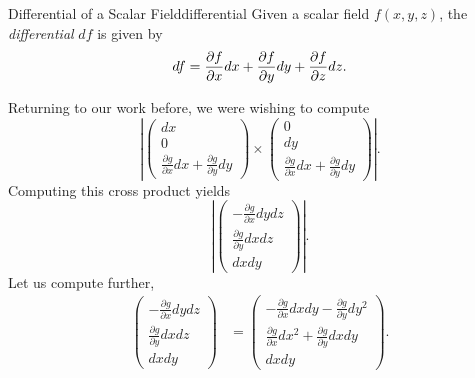                                       \begin{df}{Differential of a Scalar Field}{differential}
                                      	Given a scalar field $f(x,y,z)$, the \emph{differential} $df$ is given by
                                      	\[
                                      	df = \frac{\partial f}{\partial x}dx + \frac{\partial f}{\partial y} dy + \frac{\partial f}{\partial z} dz.
                                      	\]
                                      \end{df}
                                      
                                     Returning to our work before, we were wishing to compute
                                     \[
                                     \left| \begin{pmatrix} dx \\ 0 \\  \frac{\partial g}{\partial x}dx + \frac{\partial g}{\partial y}dy \end{pmatrix} \times \begin{pmatrix} 0 \\ dy \\  \frac{\partial g}{\partial x}dx + \frac{\partial g}{\partial y}dy \end{pmatrix}\right|.
                                     \]
                                     Computing this cross product yields
                                     \[
                                     \left| \begin{pmatrix} -\frac{\partial g}{\partial x} dydz \\ \frac{\partial g}{\partial y}dxdz \\ dxdy \end{pmatrix} \right|.
                                     \]
                                     Let us compute further,
                                    \begin{align*}
                                     \begin{pmatrix} -\frac{\partial g}{\partial x} dydz \\ \frac{\partial g}{\partial y}dxdz \\ dxdy \end{pmatrix} &= \begin{pmatrix} -\frac{\partial g}{\partial x}dxdy - \frac{\partial g}{\partial y} dy^2 \\ \frac{\partial g}{\partial x}dx^2+\frac{\partial g}{\partial y} dxdy \\ dxdy \end{pmatrix}.
                                    \end{align*}

